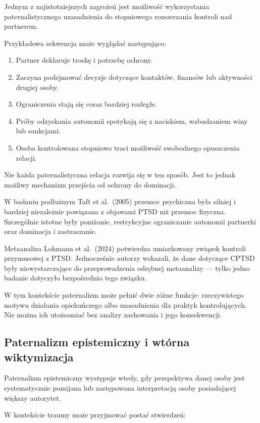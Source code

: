 \documentclass[11pt,a4paper,oneside,headinclude=true,footinclude=false]{scrartcl}
\providecommand{\tightlist}{\setlength{\itemsep}{3pt}\setlength{\parskip}{0pt}}
\begin{document}
Jednym z najistotniejszych zagrożeń jest możliwość wykorzystania
paternalistycznego uzasadnienia do stopniowego rozszerzania kontroli nad
partnerem.

Przykładowa sekwencja może wyglądać następująco:

\begin{enumerate}
\def\labelenumi{\arabic{enumi}.}
\tightlist
\item
  Partner deklaruje troskę i potrzebę ochrony.
\item
  Zaczyna podejmować decyzje dotyczące kontaktów, finansów lub
  aktywności drugiej osoby.
\item
  Ograniczenia stają się coraz bardziej rozległe.
\item
  Próby odzyskania autonomii spotykają się z naciskiem, wzbudzaniem winy
  lub sankcjami.
\item
  Osoba kontrolowana stopniowo traci możliwość swobodnego opuszczenia
  relacji.
\end{enumerate}

Nie każda paternalistyczna relacja rozwija się w ten sposób. Jest to
jednak możliwy mechanizm przejścia od ochrony do dominacji.

W badaniu podłużnym Taft et al.~(2005) przemoc psychiczna była silniej i
bardziej niezależnie powiązana z objawami PTSD niż przemoc fizyczna.
Szczególnie istotne były poniżanie, restrykcyjne ograniczanie autonomii
partnerki oraz dominacja i zastraszanie.

Metaanaliza Lohmann et al.~(2024) potwierdza umiarkowany związek
kontroli przymusowej z PTSD. Jednocześnie autorzy wskazali, że dane
dotyczące CPTSD były niewystarczające do przeprowadzenia odrębnej
metaanalizy --- tylko jedno badanie dotyczyło bezpośrednio tego związku.

W tym kontekście paternalizm może pełnić dwie różne funkcje:
rzeczywistego motywu działania opiekuńczego albo uzasadnienia dla
praktyk kontrolujących. Nie można ich utożsamiać bez analizy zachowania
i jego konsekwencji.

\subsection{Paternalizm epistemiczny i wtórna wiktymizacja}\label{subsec:4.3}

Paternalizm epistemiczny występuje wtedy, gdy perspektywa danej osoby
jest systematycznie pomijana lub zastępowana interpretacją osoby
posiadającej większy autorytet.

W kontekście traumy może przyjmować postać stwierdzeń:
\end{document}
